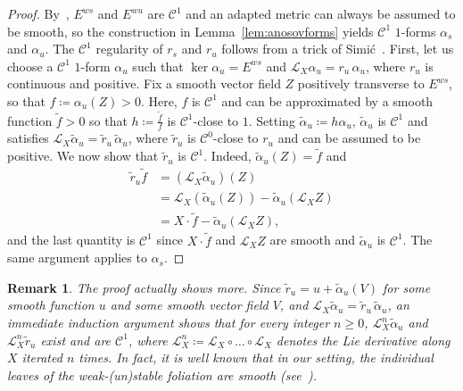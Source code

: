 \documentclass[letterpaper, 11pt]{article}
\numberwithin{equation}{section}
\newtheorem{rem}[thm]{Remark}
\begin{document}
\begin{proof}
By~\cite[Corollary 1.8]{H94}, $E^{ws}$ and $E^{wu}$ are $\mathcal{C}^1$ and an adapted metric can always be assumed to be smooth, so the construction in Lemma~\ref{lem:anosovforms} yields $\mathcal{C}^1$ $1$-forms $\alpha_s$ and $\alpha_u$. The $\mathcal{C}^1$ regularity of $r_s$ and $r_u$ follows from a trick of Simi\'{c}~\cite{S97}. First, let us choose a $\mathcal{C}^1$ $1$-form $\alpha_u$ such that $\ker \alpha_u = E^{ws}$ and $\mathcal{L}_X \alpha_u  = r_u \, \alpha_u$, where $r_u$ is continuous and positive. Fix a smooth vector field $Z$ positively transverse to $E^{ws}$, so that $f \coloneqq \alpha_u(Z) > 0$. Here, $f$ is $\mathcal{C}^1$ and can be approximated by a smooth function $\widetilde{f} > 0$ so that $h \coloneqq\frac{\widetilde{f}}{f}$ is $\mathcal{C}^1$-close to $1$. Setting $\widetilde{\alpha}_u \coloneqq h  \alpha_u$, $\widetilde{\alpha}_u$ is $\mathcal{C}^1$ and satisfies $\mathcal{L}_X \widetilde{\alpha}_u = \widetilde{r}_u \, \widetilde{\alpha}_u$, where $\widetilde{r}_u$ is $\mathcal{C}^0$-close to $r_u$ and can be assumed to be positive. We now show that $\widetilde{r}_u$ is $\mathcal{C}^1$. Indeed, $\widetilde{\alpha}_u(Z) = \widetilde{f}$ and
\begin{align*}
\widetilde{r}_u \widetilde{f} &= \left(\mathcal{L}_X \widetilde{\alpha}_u \right)(Z) \\
			&= \mathcal{L}_X \left( \widetilde{\alpha}_u(Z)\right) - \widetilde{\alpha}_u \left( \mathcal{L}_X Z\right) \\
			&= X\cdot \widetilde{f}- \widetilde{\alpha}_u \left( \mathcal{L}_X Z\right),
\end{align*}
and the last quantity is $\mathcal{C}^1$ since $X\cdot \widetilde{f}$ and $\mathcal{L}_X Z$ are smooth and $\widetilde{\alpha}_u$ is $\mathcal{C}^1$. The same argument applies to $\alpha_s$.
\end{proof}

\begin{rem} The proof actually shows more. Since $\widetilde{r}_u = u + \widetilde{\alpha}_u (V)$ for some smooth function $u$ and some smooth vector field $V$, and $\mathcal{L}_X \widetilde{\alpha}_u = \widetilde{r}_u \, \widetilde{\alpha}_u$, an immediate induction argument shows that for every integer $n \geq 0$, $\mathcal{L}_X^n \widetilde{\alpha}_u$ and $\mathcal{L}_X^n \widetilde{r}_u$ exist and are $\mathcal{C}^1$, where $\mathcal{L}_X^n \coloneqq \mathcal{L}_X \circ \dots \circ \mathcal{L}_X$ denotes the Lie derivative along $X$ iterated $n$ times. In fact, it is well known that in our setting, the individual leaves of the weak-(un)stable foliation are smooth (see~\cite[Lemma 2.1]{LMM}).
\end{rem}
\end{document}
